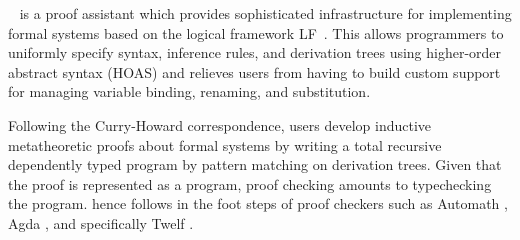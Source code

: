 %


\Beluga~\cite{Pientka:IJCAR10,Pientka:CADE15} is a proof assistant which
provides sophisticated infrastructure for implementing formal systems based on
the logical framework LF~\cite{Harper93jacm}.
This allows programmers to uniformly specify syntax, inference rules, and
derivation trees using higher-order abstract syntax (HOAS) and relieves users
from having to build custom support for managing variable binding,
renaming, and substitution.

Following the Curry-Howard correspondence, \Beluga{} users develop inductive
metatheoretic proofs about formal systems by writing a total recursive
dependently typed program by pattern matching on derivation trees.
Given that the proof is represented as a program, proof checking amounts to
typechecking the program.
\Beluga{} hence follows in the foot steps of proof checkers such as Automath
\cite{Nederpelt:94}, Agda \cite{Norell:phd07}, and specifically Twelf
\cite{Pfenning99cade}.

